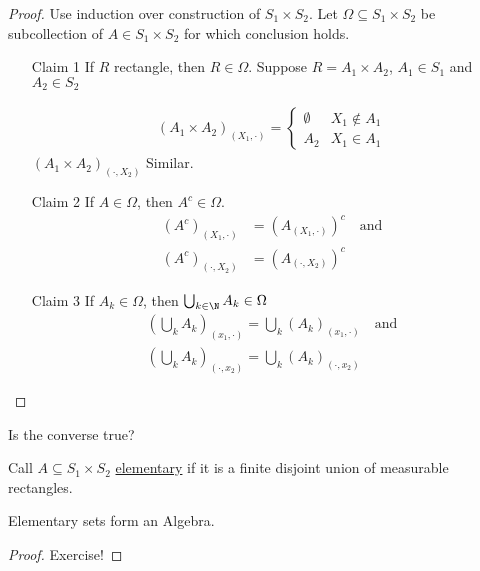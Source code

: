 \begin{proof}
	Use induction over construction of $S_1 \times S_2$.
	Let $\Omega \subseteq S_1 \times S_2$ be subcollection of $A \in S_1 \times S_2$ for which conclusion holds.

	 \begin{enumerate}
		 \item[Claim 1] If $R$ rectangle, then $R \in \Omega$. Suppose  $R = A_1 \times A_2$, $A_1 \in S_1$ and $A_2 \in S_2$

			 \begin{align*}
				 (A_1 \times A_2)_{(X_1, \cdot)} =
				 \begin{cases}
					 \emptyset & X_1 \notin A_1 \\
					 A_2 & X_1 \in A_1
				 \end{cases}
			 \end{align*} 
			 $(A_1 \times A_2)_{(\cdot, X_2)}$ Similar.
		 \item[Claim 2] If $A \in \Omega$, then  $A^c \in \Omega$.
			 \begin{align*}
				 (A^c)_{(X_1, \cdot)} &= (A_{(X_1, \cdot)})^c \quad \text{and} \\
				 (A^c)_{(\cdot, X_2)} &= (A_{(\cdot, X_2)})^c
			 \end{align*}

		 \item[Claim 3] If $A_k \in \Omega$, then  $\bigcup_{k \in \N} A_k \in \Omega$
			 \begin{align*}
				 (\bigcup_{k}A_k)_{(x_1, \cdot)} = \bigcup_{k}(A_k)_{(x_1, \cdot)} \quad \text{and} \\
				 (\bigcup_{k}A_k)_{(\cdot, x_2)} = \bigcup_{k}(A_k)_{(\cdot, x_2)}
			 \end{align*}
			 
	\end{enumerate}
\end{proof}

\begin{exercise}
	Is the converse true?
\end{exercise}

\begin{definition}
	Call $A \subseteq S_1 \times S_2$ \underline{elementary} if it is a finite disjoint union of measurable rectangles.
\end{definition}


\begin{lemma}
	Elementary sets form an Algebra.
\end{lemma}
\begin{proof}
	Exercise!
\end{proof}



